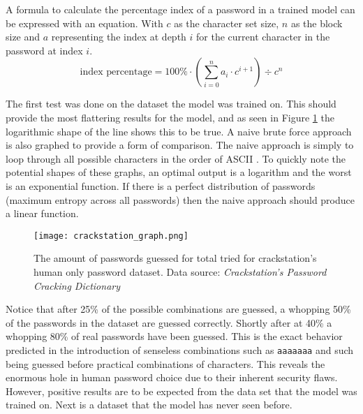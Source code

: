 \documentclass[11pt]{article}
\begin{document}
A formula to calculate the percentage index of a password in a trained model can be expressed with an equation. With $c$ as the character set size, $n$ as the block size and $a$ representing the index at depth $i$ for the current character in the password at index $i$. 
\[
\textrm{index percentage} = 100\% \cdot \left( \sum_{i=0}^{n}{a_i \cdot c^{i+1}} \right) \div c^n
\]

The first test was done on the dataset the model was trained on. This should provide the most flattering results for the model, and as seen in Figure \ref{fig:crackstation_graph} the logarithmic shape of the line shows this to be true. A naive brute force approach is also graphed to provide a form of comparison. The naive approach is simply to loop through all possible characters in the order of ASCII \cite{gorn1963american}. To quickly note the potential shapes of these graphs, an optimal output is a logarithm and the worst is an exponential function. If there is a perfect distribution of passwords (maximum entropy across all passwords) then the naive approach should produce a linear function.

\begin{figure}[H]
\centering
    \texttt{[image: crackstation\_graph.png]}
\caption{The amount of passwords guessed for total tried for crackstation's human only password dataset. Data source: \textit{Crackstation's Password Cracking Dictionary} \cite{crackstation_passwords}}

\label{fig:crackstation_graph}
\end{figure}

Notice that after 25\% of the possible combinations are guessed, a whopping 50\% of the passwords in the dataset are guessed correctly. Shortly after at 40\% a whopping 80\% of real passwords have been guessed. This is the exact behavior predicted in the introduction of senseless combinations such as \texttt{aaaaaaa} and such being guessed before practical combinations of characters. This reveals the enormous hole in human password choice due to their inherent security flaws. However, positive results are to be expected from the data set that the model was trained on. Next is a dataset that the model has never seen before.
\end{document}
